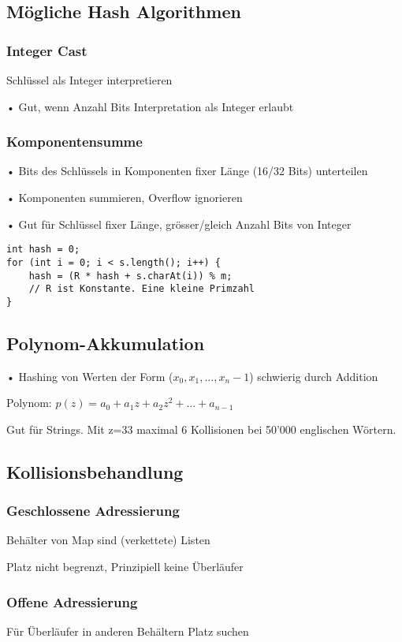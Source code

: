 \begin{multicols*}{4}
	\subsection{Mögliche Hash Algorithmen}
		\subsubsection{Integer Cast}
		Schlüssel als Integer interpretieren
		
		• Gut, wenn Anzahl Bits Interpretation als Integer erlaubt
	
		\subsubsection{Komponentensumme}
		• Bits des Schlüssels in Komponenten fixer Länge (16/32 Bits) unterteilen
		
		• Komponenten summieren, Overflow ignorieren
		
		• Gut für Schlüssel fixer Länge, grösser/gleich Anzahl Bits von Integer
		
		\begin{lstlisting}
int hash = 0;
for (int i = 0; i < s.length(); i++) {
	hash = (R * hash + s.charAt(i)) % m;
	// R ist Konstante. Eine kleine Primzahl
}
		\end{lstlisting}	
	
	\subsection{Polynom-Akkumulation}
	• Hashing von Werten der Form ($x_0, x_1 , ..., x_n-1$) schwierig durch Addition
	
	Polynom:
	$p(z) = a_0 + a_1z + a_2z^2 + ... + a_{n-1}$
		
	Gut für Strings. Mit z=33 maximal 6 Kollisionen bei 50'000 englischen Wörtern.
		
	\subsection{Kollisionsbehandlung}
		\subsubsection{Geschlossene Adressierung}
		Behälter von Map sind (verkettete) Listen
		
		Platz nicht begrenzt, Prinzipiell keine Überläufer
		
		\subsubsection{Offene Adressierung}
		Für Überläufer in anderen Behältern Platz suchen
		

\end{multicols*}
